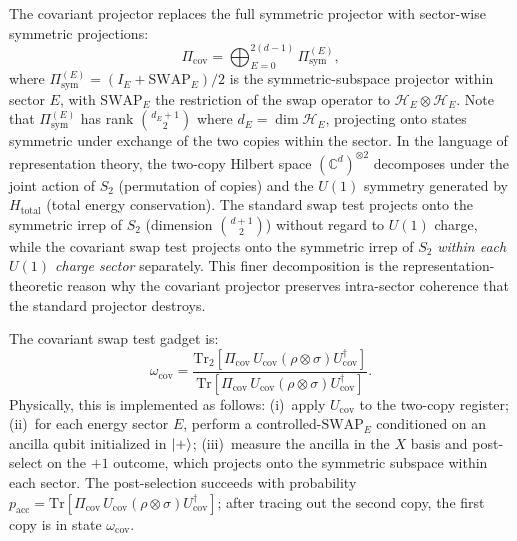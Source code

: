 \documentclass[prx,twocolumn,superscriptaddress,longbibliography,floatfix]{revtex4-2}
\begin{document}
The covariant projector replaces the full symmetric projector with sector-wise symmetric projections:
\begin{equation}
\Pi_\mathrm{cov} = \bigoplus_{E=0}^{2(d-1)} \Pi_\mathrm{sym}^{(E)},
\label{eq:pi_cov}
\end{equation}
where $\Pi_\mathrm{sym}^{(E)} = (I_E + \mathrm{SWAP}_E)/2$ is the symmetric-subspace projector within sector $E$, with $\mathrm{SWAP}_E$ the restriction of the swap operator to $\mathcal{H}_E \otimes \mathcal{H}_E$.
Note that $\Pi_\mathrm{sym}^{(E)}$ has rank $\binom{d_E+1}{2}$ where $d_E = \dim \mathcal{H}_E$, projecting onto states symmetric under exchange of the two copies within the sector.
In the language of representation theory, the two-copy Hilbert space $(\mathbb{C}^d)^{\otimes 2}$ decomposes under the joint action of $S_2$ (permutation of copies) and the $U(1)$ symmetry generated by $H_\mathrm{total}$ (total energy conservation).
The standard swap test projects onto the symmetric irrep of $S_2$ (dimension $\binom{d+1}{2}$) without regard to $U(1)$ charge, while the covariant swap test projects onto the symmetric irrep of $S_2$ \emph{within each $U(1)$ charge sector} separately.
This finer decomposition is the representation-theoretic reason why the covariant projector preserves intra-sector coherence that the standard projector destroys.

The covariant swap test gadget is:
\begin{equation}
\omega_\mathrm{cov} = \frac{\mathrm{Tr}_2[\Pi_\mathrm{cov}\, U_\mathrm{cov}(\rho \otimes \sigma)U_\mathrm{cov}^\dagger]}{\mathrm{Tr}[\Pi_\mathrm{cov}\, U_\mathrm{cov}(\rho \otimes \sigma)U_\mathrm{cov}^\dagger]}.
\label{eq:cov_gadget}
\end{equation}
Physically, this is implemented as follows: (i)~apply $U_\mathrm{cov}$ to the two-copy register; (ii)~for each energy sector $E$, perform a controlled-$\mathrm{SWAP}_E$ conditioned on an ancilla qubit initialized in $\ket{+}$; (iii)~measure the ancilla in the $X$ basis and post-select on the $+1$ outcome, which projects onto the symmetric subspace within each sector.
The post-selection succeeds with probability $p_\mathrm{acc} = \mathrm{Tr}[\Pi_\mathrm{cov}\, U_\mathrm{cov}(\rho \otimes \sigma)U_\mathrm{cov}^\dagger]$; after tracing out the second copy, the first copy is in state $\omega_\mathrm{cov}$.
\end{document}
